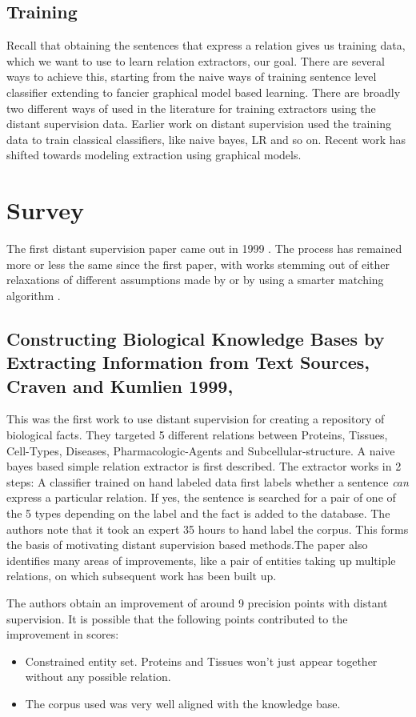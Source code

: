 \documentclass[a4paper,10pt]{article}
\begin{document}
\subsection{Training}
Recall that obtaining the sentences that express a relation gives us training data, which 
we want to use to learn relation extractors, our goal.
There are several ways to achieve this, starting from the naive ways of training sentence 
level classifier extending to fancier graphical model based learning.
There are broadly two different ways of used in the literature for training extractors using the distant supervision data.
Earlier work on distant supervision used the training data to train classical classifiers, like naive bayes, LR and so on.
Recent work has shifted towards modeling extraction using graphical models.
\section{Survey}

The first distant supervision paper came out in 1999 \cite{craven}. The process has remained more or less the same since the first paper, with 
works stemming out of either relaxations of different assumptions made by \cite{craven} or by using a smarter matching algorithm \cite{soderlandtype}.

\subsection{Constructing Biological Knowledge Bases by Extracting Information from Text Sources, Craven and Kumlien 1999, \cite{craven}}
This was the first work to use distant supervision for creating a repository of biological facts. 
They targeted 5 different relations between Proteins, Tissues, Cell-Types, Diseases, Pharmacologic-Agents and Subcellular-structure.
A naive bayes based simple relation extractor is first described. The extractor works in 2 steps:  A classifier trained on hand labeled data
first labels whether a sentence \emph{can} express a particular relation. If yes, the sentence is searched for a pair of one of the 5 types
depending on the label and the fact is added to the database.
The authors note that it took an expert 35 hours to hand label the corpus. This forms the basis of motivating distant supervision based 
methods.The paper also identifies many areas of improvements, like a pair of entities taking up multiple relations, on which subsequent work has been
built up.

The authors obtain an improvement of around 9 precision points with distant supervision.
It is possible that the following points contributed to the improvement in scores:
\begin{itemize}
 \item Constrained entity set. Proteins and Tissues won't just appear together without any possible relation. 
 \item The corpus used was very well aligned with the knowledge base.
\end{itemize}
\end{document}
